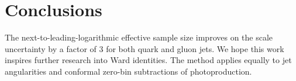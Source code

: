 \section{Conclusions}\label{sec:conclusions}

The next-to-leading-logarithmic effective sample size improves on the
scale uncertainty by a factor of 3 for both quark and gluon jets. We
hope this work inspires further research into Ward identities. The
method applies equally to jet angularities and conformal zero-bin
subtractions of photoproduction.

